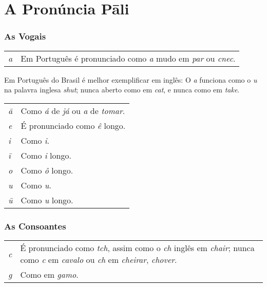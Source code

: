 \chapter{A Pronúncia Pāli}
\label{pron-pali}

\subsection{As Vogais}

\begin{tabular}{@{} L{5mm} L{\linewidth-5mm}}
\emph{a} & Em Português é pronunciado como \emph{a} mudo em \emph{par} ou \emph{cnec}.
\end{tabular}

\bigskip

Em Português do Brasil é melhor exemplificar em inglês: O \emph{a} funciona como o \emph{u} na palavra inglesa \emph{shut}; nunca aberto como em \emph{cat}, e nunca como em \emph{take}.

\bigskip

\begin{tabular}{@{} L{5mm} L{\linewidth-5mm}}
\emph{ā} & Como \emph{á} de \emph{já} ou \emph{a} de \emph{tomar}.\\

\emph{e} & É pronunciado como \emph{ê} longo.\\

\emph{i} & Como \emph{i}.\\

\emph{ī} & Como \emph{i} longo.\\

\emph{o} & Como \emph{ô} longo.\\

\emph{u} & Como \emph{u}.\\

\emph{ū} & Como \emph{u} longo.
\end{tabular}

\subsection{As Consoantes}

\begin{tabular}{@{} L{5mm} L{\linewidth-5mm}}
\emph{c} & É pronunciado como \emph{tch}, assim como o \emph{ch} inglês em \emph{chair}; nunca como \emph{c} em \emph{cavalo} ou \emph{ch} em \emph{cheirar}, \emph{chover}.\\

\emph{g} & Como em \emph{gamo}.\\
\end{tabular}

